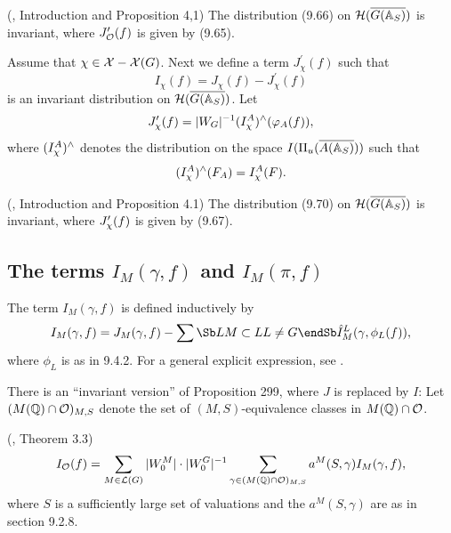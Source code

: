 \begin{proposition}
(\cite{A6}, Introduction and Proposition 4,1) The distribution
(9.66) on ${\cal{H}}(\overline{G({\Bbb{A}}_S)})$ is invariant,
where $J_{\cal{O}}^{\prime }(f)$ is given
by (9.65).
\end{proposition}

Assume that ${\chi }\in {\cal{X}}-{\cal{X}}(G)$.
Next we define a term $J_{{ \chi }}^{\prime }(f)$ such that 
\begin{equation}
I_{{\chi }}(f)=J_{{\chi }}(f)-J_{{\chi }}^{\prime }(f)
\end{equation}
is an invariant distribution on
${\cal{H}}(\overline{G({\Bbb{A}}_S)})$.
Let 
\begin{equation}
J_{{\chi }}^{\prime }(f)=|W_G|^{-1}(I_{{\cal \chi }}^A)^{\wedge
}(\varphi _A(f)),
\end{equation}
where $(I_{{\cal \chi }}^A)^{\wedge }$ denotes the distribution on the
space $I(\Pi _u(\overline{A({\Bbb {A}}_S)}))$ such that 
\[
(I_{{\cal \chi }}^A)^{\wedge }(F_A)=I_{{\cal \chi }}^A(F). 
\]

\begin{proposition}
(\cite{A6}, Introduction and Proposition 4.1) The distribution
(9.70) on ${\cal{H}}(\overline{G({\Bbb{A}}_S)})$ is invariant,
where $J_{{\cal \chi }}^{\prime }(f)$ is given by (9.67).
\end{proposition}

\subsection{The terms $I_M(\gamma, f)$ and $I_M(\pi,f)$}

The term $I_M(\gamma,f)$ is defined inductively by
\begin{equation}
I_M(\gamma,f)
=J_M(\gamma,f)-
\sum\Sb L\\ M\subset L\\ L\not= G\endSb
\hat{I}_M^L(\gamma,\phi_L(f)),
\end{equation}
where $\phi_L$ is as in 9.4.2.
For a general explicit expression, see \cite{A16}.

There is an ``invariant version'' of Proposition 299, where $J$ is
replaced by $I$: Let $(M({\Bbb{Q}})\cap {\cal{O}})_{M,S}$ denote the set of
$(M,S)$-equivalence classes in $M({\Bbb {Q}})\cap {\cal{O}}$.

\begin{proposition}
(\cite{A10}, Theorem 3.3) 
\[
I_{{\cal{O}}}(f)
=\sum_{M\in {\cal{L}}(G)}|W_0^M|\cdot |W_0^G|^{-1}
\sum_{\gamma \in (M({\Bbb{Q}})\cap {\cal{O}})_{M,S}}
a^M(S,\gamma )I_M(\gamma ,f),
\]
where $S$ is a sufficiently large set of valuations and the
$a^M(S,\gamma)$ are as in section 9.2.8.
\end{proposition}


